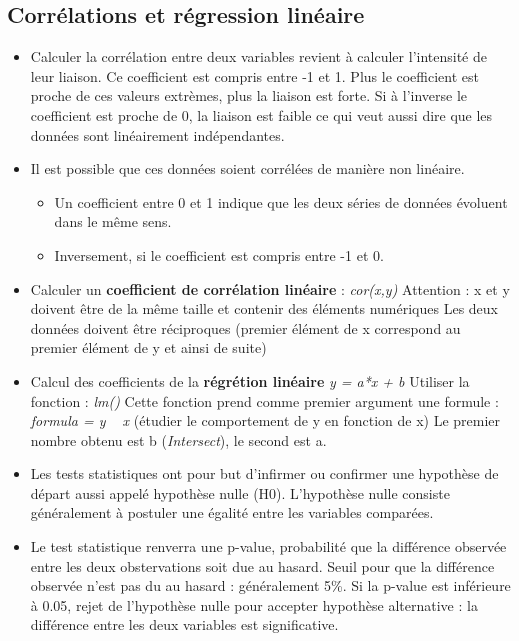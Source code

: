 \documentclass[12pt,a4paper]{article}
\begin{document}
\subsection{Corrélations et régression linéaire}
\begin{itemize}
\item Calculer la corrélation entre deux variables revient à calculer l'intensité de leur liaison. Ce coefficient est compris entre -1 et 1. Plus le coefficient est proche de ces valeurs extrèmes, plus la liaison est forte. Si à l'inverse le coefficient est proche de 0, la liaison est faible ce qui veut aussi dire que les données sont linéairement indépendantes.
\item Il est possible que ces données soient corrélées de manière non linéaire. 
\begin{itemize}
\item Un coefficient entre 0 et 1 indique que les deux séries de données évoluent dans le même sens.
\item Inversement, si le coefficient est compris entre -1 et 0.
\end{itemize}
\item Calculer un \textbf{coefficient de corrélation linéaire} : \textit{cor(x,y)}
\newline Attention : x et y doivent être de la même taille et contenir des éléments numériques
\newline Les deux données doivent être réciproques (premier élément de x correspond au premier élément de y et ainsi de suite)
\item Calcul des coefficients de la \textbf{régrétion linéaire} \textit{y = a*x + b}
\newline Utiliser la fonction : \textit{lm()}
\newline Cette fonction prend comme premier argument une formule : \textit{formula = y ~ x} (étudier le comportement de y en fonction de x)
\newline Le premier nombre obtenu est b (\textit{Intersect}), le second est a.
\item Les tests statistiques ont pour but d'infirmer ou confirmer une hypothèse de départ aussi appelé hypothèse nulle (H0). L'hypothèse nulle consiste généralement à postuler une égalité entre les variables comparées.
\item Le test statistique renverra une p-value, probabilité que la différence observée entre les deux obstervations soit due au hasard. Seuil pour que la différence observée n'est pas du au hasard : généralement 5\%.
\newline Si la p-value est inférieure à 0.05, rejet de l'hypothèse nulle pour accepter hypothèse alternative : la différence entre les deux variables est significative.

\end{itemize}
\end{document}

